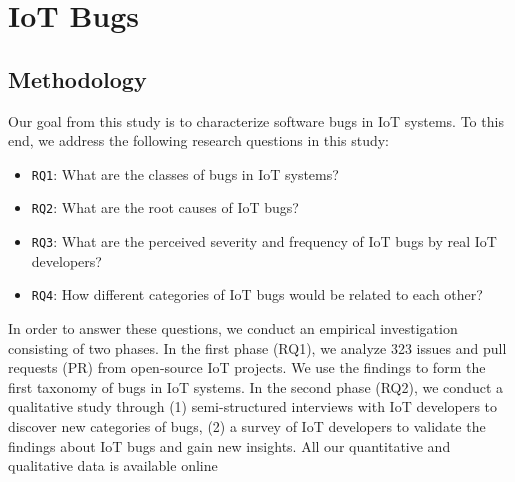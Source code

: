 
\chapter{IoT Bugs}
\label{ch:bugs}

\section{Methodology}
Our goal from this study is to characterize software bugs in IoT systems. To this end, we address the following research questions in this study:
\begin{itemize}
\item {\verb|RQ1|}: What are the classes of bugs in IoT systems?
\item {\verb|RQ2|}: What are the root causes of IoT bugs?
\item {\verb|RQ3|}: What are the perceived severity and frequency of IoT bugs by real IoT developers?
\item {\verb|RQ4|}: How different categories of IoT bugs would be related to each other?
\end{itemize}
In order to answer these questions, we conduct an empirical investigation consisting of two phases. In the first phase (RQ1), we analyze 323 issues and pull requests (PR) from open-source IoT projects. We use the findings to form the first taxonomy of bugs in IoT systems. In the second phase (RQ2), we conduct a qualitative study through (1) semi-structured interviews with IoT developers to discover new categories of bugs, (2) a survey of IoT developers to validate the findings about IoT bugs and gain new insights. All our quantitative and qualitative data is available online~\cite{repPack} 


